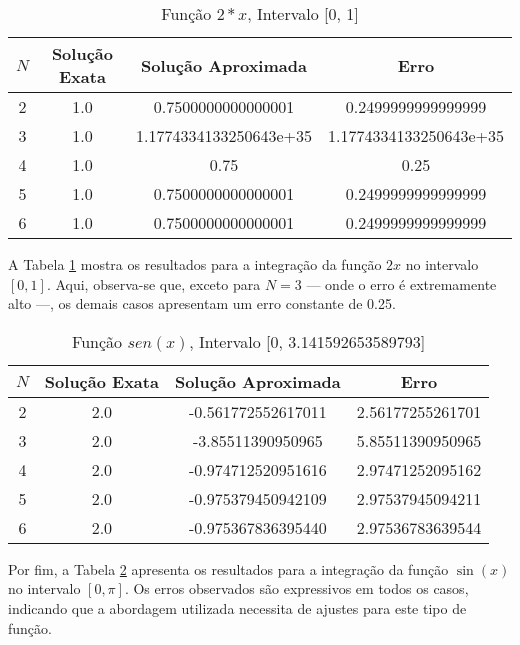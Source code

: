 \documentclass[12pt,letterpaper]{article}
\begin{document}
    \begin{table}[ht]
        \centering
        \caption{Função $2*x$, Intervalo [0, 1]}
        \begin{tabular}{|c|c|c|c|}
        \hline
          $N$ & Solução Exata & Solução Aproximada & Erro \\ \hline
          2 & 1.0 & 0.7500000000000001 & 0.2499999999999999 \\ \hline
          3 & 1.0 & 1.1774334133250643e+35 & 1.1774334133250643e+35 \\ \hline
          4 & 1.0 & 0.75 & 0.25 \\ \hline
          5 & 1.0 & 0.7500000000000001 & 0.2499999999999999 \\ \hline
          6 & 1.0 & 0.7500000000000001 & 0.2499999999999999 \\ \hline
        \end{tabular}
        \label{tab:tab4}
    \end{table} 

A Tabela \ref{tab:tab4} mostra os resultados para a integração da função \(2x\) no intervalo \([0, 1]\). Aqui, observa-se que, exceto para \(N=3\) — onde o erro é extremamente alto —, os demais casos apresentam um erro constante de 0.25.

    \begin{table}[ht]
        \centering
        \caption{Função $sen(x)$, Intervalo [0, 3.141592653589793]}
        \begin{tabular}{|c|c|c|c|}
        \hline
          $N$ & Solução Exata & Solução Aproximada & Erro \\ \hline
          2 & 2.0 & -0.561772552617011 & 2.56177255261701 \\ \hline
          3 & 2.0 & -3.85511390950965 & 5.85511390950965 \\ \hline
          4 & 2.0 & -0.974712520951616 & 2.97471252095162 \\ \hline
          5 & 2.0 & -0.975379450942109 & 2.97537945094211 \\ \hline
          6 & 2.0 & -0.975367836395440 & 2.97536783639544 \\ \hline
        \end{tabular}
        \label{tab:tab5}
    \end{table}

Por fim, a Tabela \ref{tab:tab5} apresenta os resultados para a integração da função \(\sin(x)\) no intervalo \([0, \pi]\). Os erros observados são expressivos em todos os casos, indicando que a abordagem utilizada necessita de ajustes para este tipo de função.
\end{document}
